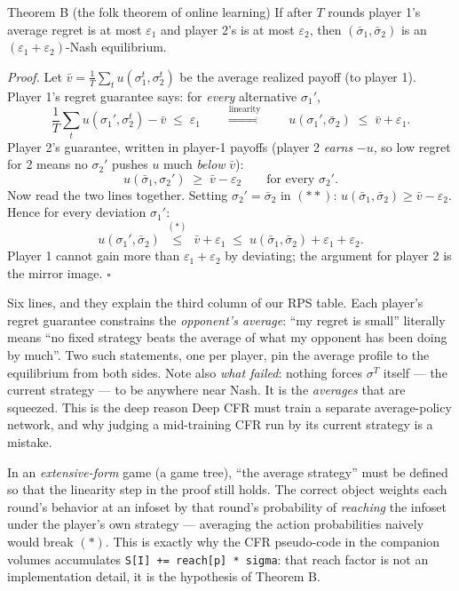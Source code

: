 \documentclass[11pt,a4paper]{article}
\begin{document}
\begin{thmbox}{Theorem B (the folk theorem of online learning)}
If after $T$ rounds player 1's average regret is at most $\varepsilon_1$ and
player 2's is at most $\varepsilon_2$, then $(\bar\sigma_1, \bar\sigma_2)$ is
an $(\varepsilon_1{+}\varepsilon_2)$-Nash equilibrium.
\end{thmbox}

\emph{Proof.} Let $\bar v = \frac1T\sum_t u(\sigma_1^t,\sigma_2^t)$ be the
average realized payoff (to player 1). Player 1's regret guarantee says: for
\emph{every} alternative $\sigma_1'$,
\[
\frac1T\sum_t u(\sigma_1', \sigma_2^t) - \bar v \;\le\; \varepsilon_1
\qquad\overset{\text{linearity}}{\Longrightarrow}\qquad
u(\sigma_1', \bar\sigma_2) \;\le\; \bar v + \varepsilon_1 .
\tag{$*$}
\]
Player 2's guarantee, written in player-1 payoffs (player 2 \emph{earns}
$-u$, so low regret for 2 means no $\sigma_2'$ pushes $u$ much \emph{below}
$\bar v$):
\[
u(\bar\sigma_1, \sigma_2') \;\ge\; \bar v - \varepsilon_2
\qquad\text{for every } \sigma_2' .
\tag{$**$}
\]
Now read the two lines together. Setting $\sigma_2' = \bar\sigma_2$ in
$(**)$: $u(\bar\sigma_1,\bar\sigma_2) \ge \bar v - \varepsilon_2$. Hence for
every deviation $\sigma_1'$:
\[
u(\sigma_1', \bar\sigma_2)
\;\overset{(*)}{\le}\; \bar v + \varepsilon_1
\;\le\; u(\bar\sigma_1, \bar\sigma_2) + \varepsilon_1 + \varepsilon_2 .
\]
Player 1 cannot gain more than $\varepsilon_1{+}\varepsilon_2$ by deviating;
the argument for player 2 is the mirror image. $\square$

\begin{intuition}
Six lines, and they explain the third column of our RPS table. Each player's
regret guarantee constrains the \emph{opponent's average}: ``my regret is
small'' literally means ``no fixed strategy beats the average of what my
opponent has been doing by much''. Two such statements, one per player, pin
the average profile to the equilibrium from both sides. Note also \emph{what
failed}: nothing forces $\sigma^T$ itself --- the current strategy --- to be
anywhere near Nash. It is the \emph{averages} that are squeezed. This is the
deep reason Deep CFR must train a separate average-policy network, and why
judging a mid-training CFR run by its current strategy is a mistake.
\end{intuition}

\begin{trap}
In an \emph{extensive-form} game (a game tree), ``the average strategy''
must be defined so that the linearity step in the proof still holds. The
correct object weights each round's behavior at an infoset by that round's
probability of \emph{reaching} the infoset under the player's own strategy
--- averaging the action probabilities naively would break $(*)$. This is
exactly why the CFR pseudo-code in the companion volumes accumulates
\texttt{S[I] += reach[p] * sigma}: that reach factor is not an implementation
detail, it is the hypothesis of Theorem B.
\end{trap}
\end{document}
